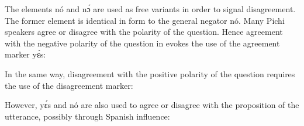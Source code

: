 The elements nó and nɔ́ are used as free variants in order to signal disagreement. The former element is identical in form to the general negator nó. Many Pichi speakers agree or disagree with the polarity of the question. Hence agreement with the negative polarity of the question in  evokes the use of the agreement marker yɛ́s:



\ea%
    \label{ex:key:651}
\z
\z

In the same way, disagreement with the positive polarity of the question requires the use of the disagreement marker: 


\ea%
    \label{ex:key:652}
\z
\z

However, yɛ́s and nó are also used to agree or disagree with the proposition of the utterance, possibly through Spanish influence:


\ea%
    \label{ex:key:653}
\z
\z

